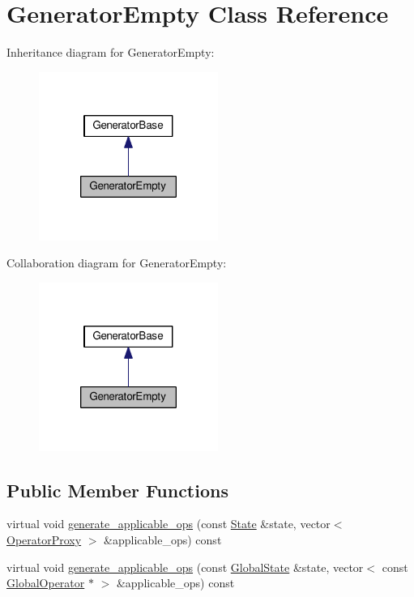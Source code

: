 \hypertarget{classGeneratorEmpty}{\section{Generator\-Empty Class Reference}
\label{classGeneratorEmpty}
}


Inheritance diagram for Generator\-Empty\-:
\nopagebreak
\begin{figure}[H]
\begin{center}
\leavevmode
\includegraphics[width=166pt]{classGeneratorEmpty__inherit__graph}
\end{center}
\end{figure}


Collaboration diagram for Generator\-Empty\-:
\nopagebreak
\begin{figure}[H]
\begin{center}
\leavevmode
\includegraphics[width=166pt]{classGeneratorEmpty__coll__graph}
\end{center}
\end{figure}
\subsection*{Public Member Functions}
\begin{DoxyCompactItemize}
\item 
virtual void \hyperlink{classGeneratorEmpty_adcae6e52fac7e0fbac9194ee84981b6d}{generate\-\_\-applicable\-\_\-ops} (const \hyperlink{classState}{State} \&state, vector$<$ \hyperlink{classOperatorProxy}{Operator\-Proxy} $>$ \&applicable\-\_\-ops) const 
\item 
virtual void \hyperlink{classGeneratorEmpty_a57531ab4b565c0bf892766d48ca881b8}{generate\-\_\-applicable\-\_\-ops} (const \hyperlink{classGlobalState}{Global\-State} \&state, vector$<$ const \hyperlink{classGlobalOperator}{Global\-Operator} $\ast$ $>$ \&applicable\-\_\-ops) const 
\end{DoxyCompactItemize}


